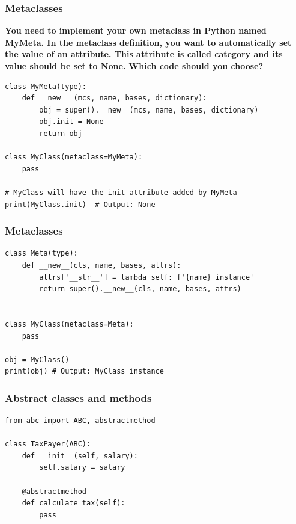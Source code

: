 \subsubsection{Metaclasses}
\textbf{You need to implement your own metaclass in Python named MyMeta. In the metaclass definition, you want to automatically set the value of an attribute. This attribute is called category and its value should be set to None. Which code should you choose?}

\begin{codebox}
\begin{verbatim}
class MyMeta(type):
    def __new__ (mcs, name, bases, dictionary):
        obj = super().__new__(mcs, name, bases, dictionary)
        obj.init = None
        return obj

class MyClass(metaclass=MyMeta):
    pass

# MyClass will have the init attribute added by MyMeta
print(MyClass.init)  # Output: None
\end{verbatim}
\end{codebox}

\subsubsection{Metaclasses}
\begin{codebox}
\begin{verbatim}
class Meta(type):
    def __new__(cls, name, bases, attrs):
        attrs['__str__'] = lambda self: f'{name} instance'
        return super().__new__(cls, name, bases, attrs)
 
 
class MyClass(metaclass=Meta):
    pass
 
obj = MyClass()
print(obj) # Output: MyClass instance
\end{verbatim}
\end{codebox}

\newpage
\subsubsection{Abstract classes and methods}

\begin{codebox}
\begin{verbatim}
from abc import ABC, abstractmethod
 
class TaxPayer(ABC):
    def __init__(self, salary):
        self.salary = salary
 
    @abstractmethod
    def calculate_tax(self):
        pass
\end{verbatim}
\end{codebox}

